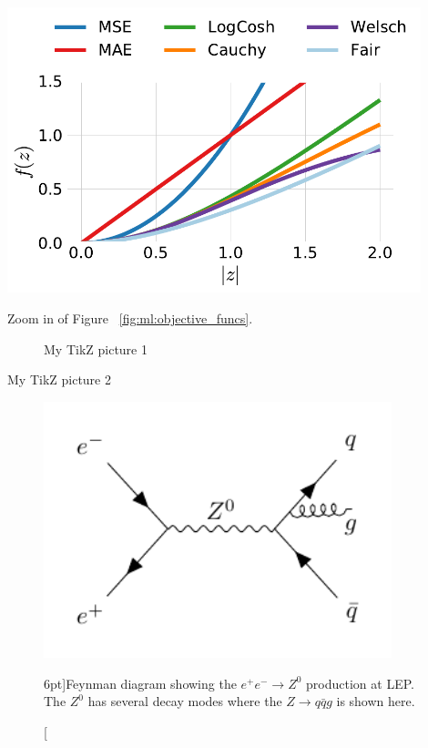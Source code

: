 \documentclass[a4paper, twoside]{tufte-book}
\newcommand{\figref}[1]{Figure ~\ref{#1}}
\begin{document}
\begin{marginfigure}
  \includegraphics[width=0.9\textwidth]{figures/objective_functions/objective_functions_zoom.pdf}
  \caption[Comparison of different objective functions zoom in.]
    {Zoom in of \figref{fig:ml:objective_funcs}. 
    }
  \label{fig:ml:objective_funcs_zoom}
\end{marginfigure}





\begin{figure}
  \caption{My TikZ picture 1}
  \label{fig:tikz:decision_tree_1}
\end{figure}

\begin{marginfigure}[-4cm]
  \caption{My TikZ picture 2}
  \label{fig:tikz:decision_tree_2}
\end{marginfigure}



\begin{figure}
  \includegraphics[width=0.9\textwidth]{figures/feynman_diagrams/eeZqqg.pdf}
  \caption[Feynman diagram for the jet production at LEP][6pt]{Feynman diagram showing the $e^+ e^- \rightarrow Z^0$ production at LEP. The $Z^0$ has several decay modes where the $Z \rightarrow q\bar{q}g$ is shown here.}
  \label{fig:feynman_3j_qqg}
\end{figure}
\end{document}
